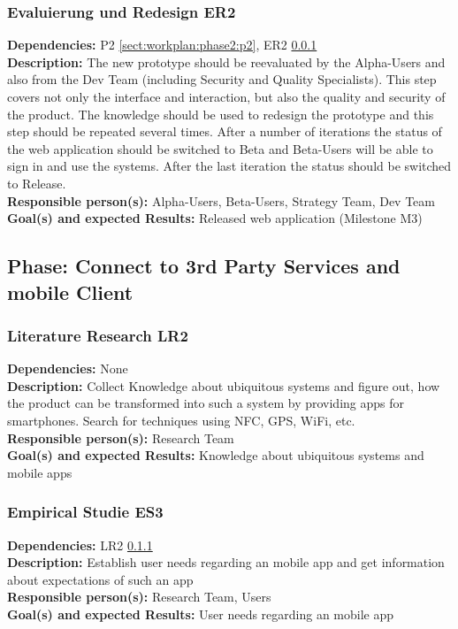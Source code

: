 \documentclass[a4paper,11pt]{article}
\begin{document}
\subsubsection{Evaluierung und Redesign ER2}
\label{sect:workplan:phase2:er2}
\textbf{Dependencies:} P2 \ref{sect:workplan:phase2:p2}, ER2 \ref{sect:workplan:phase2:er2}\\
\textbf{Description:} The new prototype should be reevaluated by the Alpha-Users and also from the Dev Team (including Security and Quality Specialists). This step covers not only the interface and interaction, but also the quality and security of the product. The knowledge should be used to redesign the prototype and this step should be repeated several times. After a number of iterations the status of the web application should be switched to Beta and Beta-Users will be able to sign in and use the systems. After the last iteration the status should be switched to Release.\\
\textbf{Responsible person(s):} Alpha-Users, Beta-Users, Strategy Team, Dev Team\\
\textbf{Goal(s) and expected Results:} Released web application (Milestone M3)\\

\subsection{Phase: Connect to 3rd Party Services and mobile Client}
\label{sect:workplan:3rdpartiesandmobileclient}

\subsubsection{Literature Research LR2}
\label{sect:workplan:phase3:lr2}
\textbf{Dependencies:} None\\
\textbf{Description:} Collect Knowledge about ubiquitous systems and figure out, how the product can be transformed into such a system by providing apps for smartphones. Search for techniques using NFC, GPS, WiFi, etc.\\
\textbf{Responsible person(s):} Research Team\\
\textbf{Goal(s) and expected Results:} Knowledge about ubiquitous systems and mobile apps\\

\subsubsection{Empirical Studie ES3}
\label{sect:workplan:phase3:es3}
\textbf{Dependencies:} LR2 \ref{sect:workplan:phase3:lr2}\\
\textbf{Description:} Establish user needs regarding an mobile app and get information about expectations of such an app \\
\textbf{Responsible person(s):} Research Team, Users\\
\textbf{Goal(s) and expected Results:} User needs regarding an mobile app\\
\end{document}

